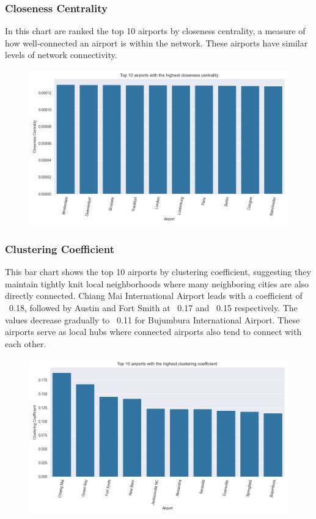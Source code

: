 \documentclass[12pt]{article}
\begin{document}
\subsubsection{Closeness Centrality}
In this chart are ranked the top 10 airports by closeness centrality, a measure of how well-connected an airport is within the network. These airports have similar levels of network connectivity.

\begin{figure}[H]
    \centering
    \includegraphics[width=0.8\linewidth]{img/closeness_centrality.png}
\end{figure}

\subsubsection{Clustering Coefficient}
This bar chart shows the top 10 airports by clustering coefficient, suggesting they maintain tightly knit local neighborhoods where many neighboring cities are also directly connected. Chiang Mai International Airport leads with a coefficient of ~0.18, followed by Austin and Fort Smith at ~0.17 and ~0.15 respectively. The values decrease gradually to ~0.11 for Bujumbura International Airport. These airports serve as local hubs where connected airports also tend to connect with each other.

\begin{figure}[H]
    \centering
    \includegraphics[width=0.8\linewidth]{img/clustering_coefficient.png}
\end{figure}
\end{document}
